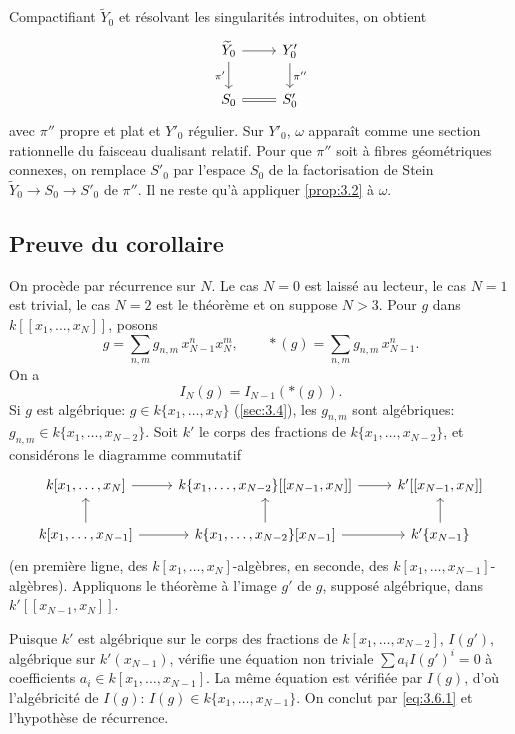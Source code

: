 \documentclass[12pt,a4paper]{article}
\theoremstyle{plain}
\theoremstyle{definition}
\theoremstyle{remark}
\begin{document}
Compactifiant $\widetilde{Y}_0$ et résolvant les singularités introduites, on obtient
\[
\begin{tikzcd}
\widetilde{Y}_0 \ar[r] \ar[d,"\pi'"'] & Y'_0 \ar[d,"\pi''"] \\
S_0 \ar[r,equal] & S'_0
\end{tikzcd}
\]
avec $\pi''$ propre et plat et $Y'_0$ régulier. Sur $Y'_0$, $\omega$ apparaît comme une section
rationnelle du faisceau dualisant relatif. Pour que $\pi''$ soit à fibres géométriques
connexes, on remplace $S'_0$ par l'espace $S_0$ de la factorisation de Stein
$\widetilde{Y}_0\to S_0\to S'_0$ de $\pi''$. Il ne reste qu'à appliquer \ref{prop:3.2} à $\omega$.

\subsection{Preuve du corollaire}\label{sec:3.6}

On procède par récurrence sur $N$. Le cas $N=0$ est laissé au lecteur, le cas $N=1$
est trivial, le cas $N=2$ est le théorème et on suppose $N>3$. Pour $g$ dans
$k[[x_1,\dots,x_N]]$, posons
\[
g=\sum_{n,m}g_{n,m}\,x_{N-1}^n x_N^m,\qquad *(g)=\sum_{n,m}g_{n,m}\,x_{N-1}^n.
\]
On a
\begin{equation}\label{eq:3.6.1}
I_N(g)=I_{N-1}(*(g)).
\end{equation}
Si $g$ est algébrique: $g\in k\{x_1,\dots,x_N\}$ (\ref{sec:3.4}), les $g_{n,m}$ sont
algébriques: $g_{n,m}\in k\{x_1,\dots,x_{N-2}\}$. Soit $k'$ le corps des fractions de
$k\{x_1,\dots,x_{N-2}\}$, et considérons le diagramme commutatif
\[
\begin{tikzcd}
k[x_1,\dots,x_N] \ar[r] & k\{x_1,\dots,x_{N-2}\}[[x_{N-1},x_N]] \ar[r] & k'[[x_{N-1},x_N]] \\
k[x_1,\dots,x_{N-1}] \ar[r] \ar[u] & k\{x_1,\dots,x_{N-2}\}[x_{N-1}] \ar[r] \ar[u] & k'\{x_{N-1}\} \ar[u]
\end{tikzcd}
\]
(en première ligne, des $k[x_1,\dots,x_N]$-algèbres, en seconde, des
$k[x_1,\dots,x_{N-1}]$-algèbres). Appliquons le théorème à l'image $g'$ de $g$,
supposé algébrique, dans $k'[[x_{N-1},x_N]]$.

Puisque $k'$ est algébrique sur le corps des fractions de
$k[x_1,\dots,x_{N-2}]$, $I(g')$, algébrique sur $k'(x_{N-1})$, vérifie une équation non triviale
$\sum a_i I(g')^i=0$ à coefficients $a_i\in k[x_1,\dots,x_{N-1}]$. La même équation est vérifiée
par $I(g)$, d'où l'algébricité de $I(g)$: $I(g)\in k\{x_1,\dots,x_{N-1}\}$. On conclut par
\eqref{eq:3.6.1} et l'hypothèse de récurrence.
\end{document}
